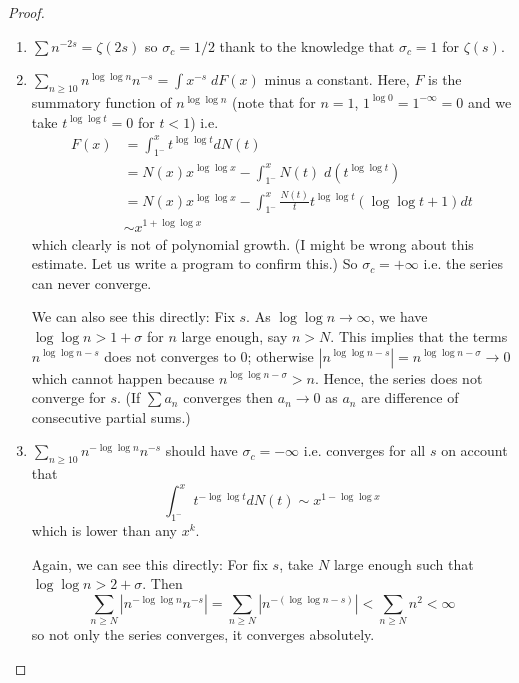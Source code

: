 \documentclass[12pt]{article}
\begin{document}
\begin{proof}
\begin{enumerate}
\item $\sum n^{-2s} = \zeta(2s)$ so $\sigma_c = 1/2$ thank to the knowledge that $\sigma_c = 1$ for $\zeta(s)$.

\item $\sum_{n \geq 10} n^{\log \log n} n^{-s} = \int x^{-s} \; dF(x)$ minus a constant. Here, $F$ is the summatory function of $n^{\log \log n}$ (note that for $n = 1$, $1^{\log 0} = 1^{-\infty} = 0$ and we take $t^{\log \log t} = 0$ for $t < 1$) i.e.
\begin{align*}
F(x) &= \int_{1^-}^x t^{\log \log t} dN(t)\\
&= N(x) x^{\log \log x} - \int_{1^-}^x N(t) \; d\left( t^{\log \log t} \right)\\
&= N(x) x^{\log \log x} - \int_{1^-}^x \frac{N(t)}{t} t^{\log \log t}(\log \log t + 1) dt\\
&\sim x^{1 + \log \log x}
\end{align*}
which clearly is not of polynomial growth. (I might be wrong about this estimate. Let us write a program to confirm this.) So $\sigma_c = +\infty$ i.e. the series can never converge.

We can also see this directly: Fix $s$. As $\log \log n \rightarrow \infty$, we have $\log \log n > 1 + \sigma$ for $n$ large enough, say $n > N$. This implies that the terms $n^{\log \log n - s}$ does not converges to 0; otherwise $|n^{\log \log n - s}| = n^{\log \log n - \sigma} \rightarrow 0$ which cannot happen because $n^{\log \log n - \sigma} > n$. Hence, the series does not converge for $s$. (If $\sum a_n$ converges then $a_n \rightarrow 0$ as $a_n$ are difference of consecutive partial sums.)

\item $\sum_{n \geq 10} n^{-\log \log n} n^{-s}$ should have $\sigma_c = -\infty$ i.e. converges for all $s$ on account that
$$\int_{1^-}^x t^{-\log \log t} dN(t) \sim x^{1 - \log \log x}$$
which is lower than any $x^k$.

Again, we can see this directly: For fix $s$, take $N$ large enough such that $\log \log n > 2 + \sigma$. Then
$$\sum_{n \geq N} |n^{-\log \log n} n^{-s}| = \sum_{n \geq N} |n^{-(\log \log n - s)}| < \sum_{n \geq N} n^2 < \infty$$
so not only the series converges, it converges absolutely.
\end{enumerate}
\end{proof}

\unless\ifdefined\IsMainDocument
\end{document}
